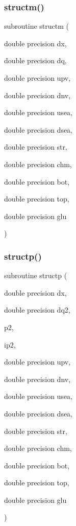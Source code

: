 \mbox{\label{lhaglue_8f_a48c73a508b0c249f810fcabae7e29b01}} 
\subsubsection{\texorpdfstring{structm()}{structm()}}
{\footnotesize\ttfamily subroutine structm (\begin{DoxyParamCaption}\item[{double precision}]{dx,  }\item[{double precision}]{dq,  }\item[{double precision}]{upv,  }\item[{double precision}]{dnv,  }\item[{double precision}]{usea,  }\item[{double precision}]{dsea,  }\item[{double precision}]{str,  }\item[{double precision}]{chm,  }\item[{double precision}]{bot,  }\item[{double precision}]{top,  }\item[{double precision}]{glu }\end{DoxyParamCaption})}

\mbox{\label{lhaglue_8f_ac9129e9599a2f7d78477bb112fce9ec5}} 
\subsubsection{\texorpdfstring{structp()}{structp()}}
{\footnotesize\ttfamily subroutine structp (\begin{DoxyParamCaption}\item[{double precision}]{dx,  }\item[{double precision}]{dq2,  }\item[{}]{p2,  }\item[{}]{ip2,  }\item[{double precision}]{upv,  }\item[{double precision}]{dnv,  }\item[{double precision}]{usea,  }\item[{double precision}]{dsea,  }\item[{double precision}]{str,  }\item[{double precision}]{chm,  }\item[{double precision}]{bot,  }\item[{double precision}]{top,  }\item[{double precision}]{glu }\end{DoxyParamCaption})}

